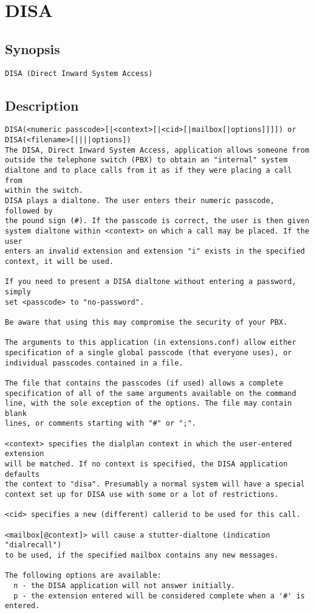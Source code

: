 \section{DISA}
\subsection{Synopsis}
\begin{verbatim}
DISA (Direct Inward System Access)
\end{verbatim}
\subsection{Description}
\begin{verbatim}
DISA(<numeric passcode>[|<context>[|<cid>[|mailbox[|options]]]]) or
DISA(<filename>[||||options])
The DISA, Direct Inward System Access, application allows someone from 
outside the telephone switch (PBX) to obtain an "internal" system 
dialtone and to place calls from it as if they were placing a call from 
within the switch.
DISA plays a dialtone. The user enters their numeric passcode, followed by
the pound sign (#). If the passcode is correct, the user is then given
system dialtone within <context> on which a call may be placed. If the user
enters an invalid extension and extension "i" exists in the specified
context, it will be used.

If you need to present a DISA dialtone without entering a password, simply
set <passcode> to "no-password".

Be aware that using this may compromise the security of your PBX.

The arguments to this application (in extensions.conf) allow either
specification of a single global passcode (that everyone uses), or
individual passcodes contained in a file.

The file that contains the passcodes (if used) allows a complete
specification of all of the same arguments available on the command
line, with the sole exception of the options. The file may contain blank
lines, or comments starting with "#" or ";".

<context> specifies the dialplan context in which the user-entered extension
will be matched. If no context is specified, the DISA application defaults
the context to "disa". Presumably a normal system will have a special
context set up for DISA use with some or a lot of restrictions.

<cid> specifies a new (different) callerid to be used for this call.

<mailbox[@context]> will cause a stutter-dialtone (indication "dialrecall")
to be used, if the specified mailbox contains any new messages.

The following options are available:
  n - the DISA application will not answer initially.
  p - the extension entered will be considered complete when a '#' is entered.

\end{verbatim}


